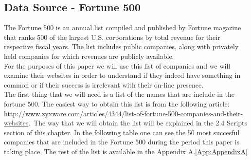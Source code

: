 \documentclass{article}
\begin{document}
\subsection{Data Source - Fortune 500}
The Fortune 500 is an annual list compiled and published by Fortune magazine that ranks 500 of the largest U.S. corporations by total revenue for their respective fiscal years. The list includes public companies, along with privately held companies for which revenues are publicly available.\cite{key1, key2}\\ 
For the purposes of this paper we will use this list of companies and we will examine their websites in order to understand if they indeed have something in common or if their success is irrelevant with their on-line presence.\\
The first thing that we will need is a list of the names that are include in the fortune 500. The easiest way to obtain this list is from the following article:
\href{url}{http://www.zyxware.com/articles/4344/list-of-fortune-500-companies-and-their-websites}.\ The way that we will obtain the list will be explained in the 2.4 Scripts section of this chapter.
In the following table one can see the 50 most succesful companies that are included in the Fortune 500 during the period this paper is taking place. The rest of the list is available in the Appendix A.\ref{App:AppendixA}
\end{document}
